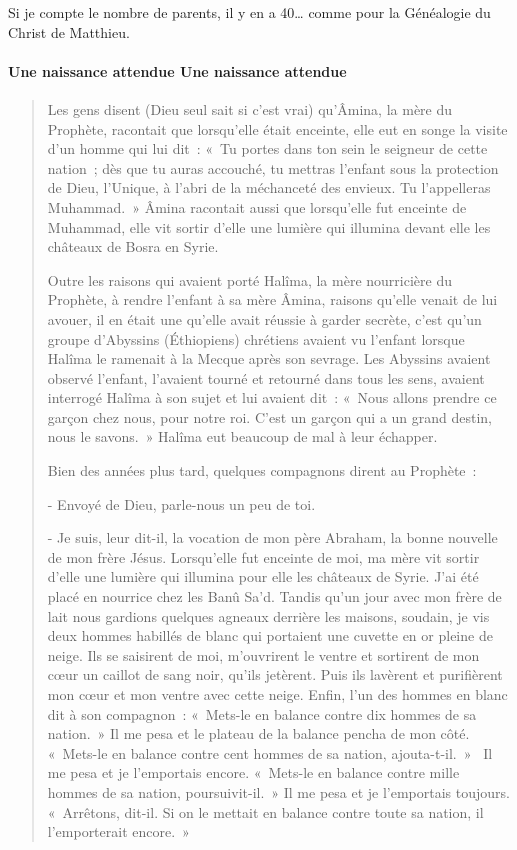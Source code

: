 Si je compte le nombre de parents, il y en a 40\ldots{} comme pour la
Généalogie du Christ de Matthieu.


\paragraph{{Une naissance attendue
}{Une naissance attendue }}

\begin{quotation}
    

Les gens disent (Dieu seul sait si c'est vrai) qu'Âmina, la mère du
Prophète, racontait que lorsqu'elle était enceinte, elle eut en songe la
visite d'un homme qui lui dit~: «~Tu portes dans ton sein le seigneur de
cette nation~; dès que tu auras accouché, tu mettras l'enfant sous la
protection de Dieu, l'Unique, à l'abri de la méchanceté des envieux. Tu
l'appelleras Muhammad.~» Âmina racontait aussi que lorsqu'elle fut
enceinte de Muhammad, elle vit sortir d'elle une lumière qui illumina
devant elle les châteaux de Bosra en Syrie.

Outre les raisons qui avaient porté Halîma, la mère nourricière du
Prophète, à rendre l'enfant à sa mère Âmina, raisons qu'elle venait de
lui avouer, il en était une qu'elle avait réussie à garder secrète,
c'est qu'un groupe d'Abyssins (Éthiopiens) chrétiens avaient vu l'enfant
lorsque Halîma le ramenait à la Mecque après son sevrage. Les Abyssins
avaient observé l'enfant, l'avaient tourné et retourné dans tous les
sens, avaient interrogé Halîma à son sujet et lui avaient dit~: «~Nous
allons prendre ce garçon chez nous, pour notre roi. C'est un
garçon qui a un grand destin, nous le savons.~» Halîma eut beaucoup de
mal à leur échapper.

Bien des années plus tard, quelques compagnons dirent au Prophète~:

- Envoyé de Dieu, parle-nous un peu de toi.

- Je suis, leur dit-il, la vocation de mon père Abraham, la bonne
nouvelle de mon frère Jésus. Lorsqu'elle fut enceinte de moi, ma mère
vit sortir d'elle une lumière qui illumina pour elle les châteaux de
Syrie. J'ai été placé en nourrice chez les Banû Sa'd. Tandis qu'un jour
avec mon frère de lait nous gardions quelques agneaux derrière les
maisons, soudain, je vis deux hommes habillés de blanc qui portaient une
cuvette en or pleine de neige. Ils se saisirent de moi, m'ouvrirent le
ventre et sortirent de mon cœur un caillot de sang noir, qu'ils
jetèrent. Puis ils lavèrent et purifièrent mon cœur et mon ventre avec
cette neige. Enfin, l'un des hommes en blanc dit à son compagnon~:
«~Mets-le en balance contre dix hommes de sa nation.~» Il me pesa et le
plateau de la balance pencha de mon côté. «~Mets-le en balance contre
cent hommes de sa nation, ajouta-t-il.~»~ Il me pesa et je l'emportais
encore. «~Mets-le en balance contre mille hommes de sa nation,
poursuivit-il.~» Il me pesa et je l'emportais toujours. «~Arrêtons,
dit-il. Si on le mettait en balance contre toute sa nation, il
l'emporterait encore.~»


\end{quotation}
